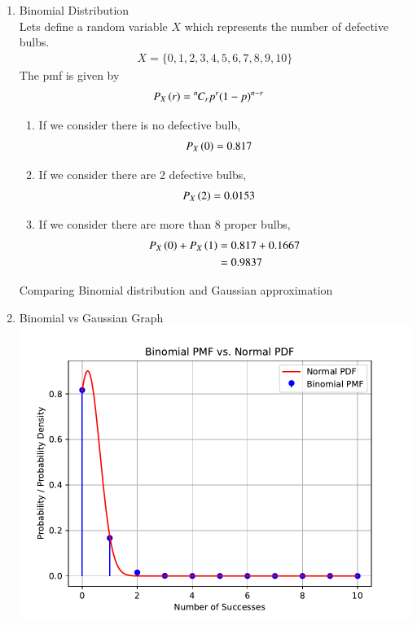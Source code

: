 \documentclass[journal,12pt,onecolumn]{IEEEtran}
\theoremstyle{remark}
\begin{document}
\begin{enumerate}[label=(\roman*)]
\begin{enumerate}[label=(\alph*)]
\end{enumerate}
\item Binomial Distribution\\
Lets define a random variable $X$ which represents the number of defective bulbs.
\begin{align}
X = \{0,1,2,3,4,5,6,7,8,9,10\}
\end{align}
The pmf is given by 
\begin{align} 
P_X\left(r\right) &= {{}^{n}\mkern-1muC_{r}} p^{r}(1-p)^{n-r}
\end{align}
\begin{enumerate}[label=(\alph*)]
\item If we consider there is no defective bulb, 
\begin{align}
P_X\left(0\right) &= 0.817
\end{align}
\item If we consider there are 2 defective bulbs, 
\begin{align}
P_X\left(2\right) &= 0.0153
\end{align}
\item If we consider there are more than 8 proper bulbs, 
\begin{align}
P_X\left(0\right) + P_X\left(1\right)  &= 0.817 + 0.1667\\
			   &= 0.9837
\end{align}
\end{enumerate}
\begin{table}[!hbt]
	
	\caption{Comparing Binomial distribution and Gaussian approximation}
	\label{table:gaussian/9/3/25/a}
\end{table}
\item Binomial vs Gaussian Graph\\
\includegraphics[width=\columnwidth]{./figs/plot.pdf}
\end{enumerate}
\end{document}
